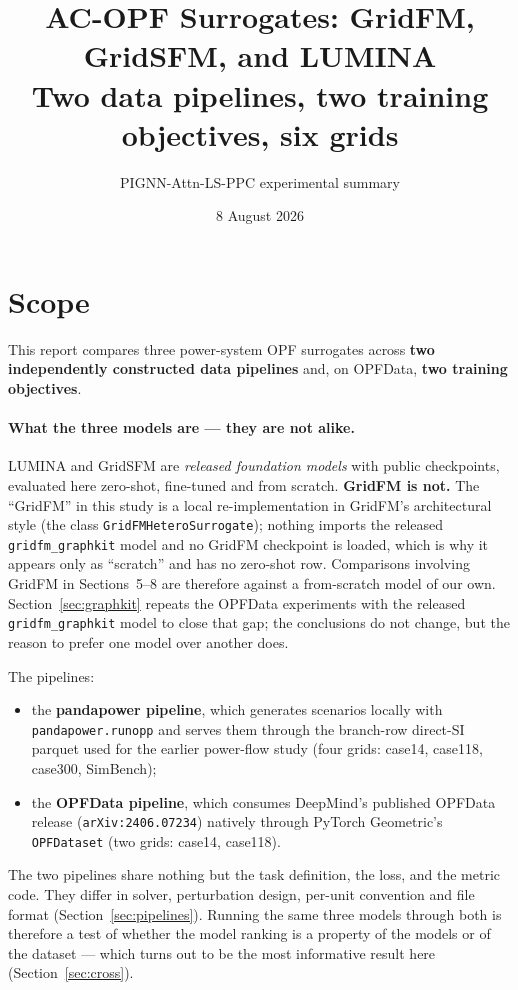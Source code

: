 \documentclass[10pt]{article}
\title{AC-OPF Surrogates: GridFM, GridSFM, and LUMINA\\
\large Two data pipelines, two training objectives, six grids}
\author{PIGNN-Attn-LS-PPC experimental summary}
\date{8 August 2026}
\begin{document}
\maketitle

\section{Scope}
This report compares three power-system OPF surrogates across \textbf{two
independently constructed data pipelines} and, on OPFData, \textbf{two training
objectives}.

\paragraph{What the three models are --- they are not alike.} LUMINA and GridSFM
are \emph{released foundation models} with public checkpoints, evaluated here
zero-shot, fine-tuned and from scratch. \textbf{GridFM is not.} The ``GridFM'' in
this study is a local re-implementation in GridFM's architectural style
(the class \texttt{GridFMHeteroSurrogate}); nothing imports the released
\texttt{gridfm\_graphkit} model and no GridFM checkpoint is loaded,
which is why it appears only as ``scratch'' and has no zero-shot row. Comparisons
involving GridFM in Sections~5--8 are therefore against a from-scratch model of
our own. Section~\ref{sec:graphkit} repeats the OPFData experiments with the
released \texttt{gridfm\_graphkit} model to close that gap; the conclusions do
not change, but the reason to prefer one model over another does.

The pipelines:

\begin{itemize}\itemsep2pt
\item the \textbf{pandapower pipeline}, which generates scenarios locally with
\texttt{pandapower.runopp} and serves them through the branch-row direct-SI
parquet used for the earlier power-flow study (four grids: case14, case118,
case300, SimBench);
\item the \textbf{OPFData pipeline}, which consumes DeepMind's published
OPFData release (\texttt{arXiv:2406.07234}) natively through PyTorch
Geometric's \texttt{OPFDataset} (two grids: case14, case118).
\end{itemize}

The two pipelines share nothing but the task definition, the loss, and the
metric code. They differ in solver, perturbation design, per-unit convention and
file format (Section~\ref{sec:pipelines}). Running the same three models through
both is therefore a test of whether the model ranking is a property of the
models or of the dataset --- which turns out to be the most informative result
here (Section~\ref{sec:cross}).
\end{document}
